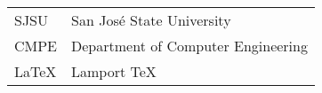 
{
\singlespace
\renewcommand{\arraystretch}{1.2}%
\begin{tabularx}{\linewidth}{ l X }
  SJSU & San Jos\'{e} State University  \\
  CMPE & Department of Computer Engineering\\
  LaTeX &  Lamport TeX \\
\end{tabularx}
}